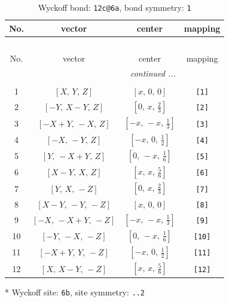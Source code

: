 \documentclass[fleqn,8pt]{jsarticle}
\begin{document}
\begin{longtable}{cccc}
\caption{Wyckoff bond: {\tt 12c@6a}, bond symmetry: {\tt 1}}
 \\
 \hline \hline
No. & vector & center & mapping \\ \hline \endfirsthead

\multicolumn{3}{l}{\tablename\ \thetable{}} \\
 \hline \hline
No. & vector & center & mapping \\ \hline \endhead

 \hline \hline
\multicolumn{3}{r}{\footnotesize\it continued ...} \\ \endfoot

 \hline \hline
\multicolumn{3}{r}{} \\ \endlastfoot

1 & $\left[ X,\, Y,\, Z \right]$ & $\left[ x,\, 0,\, 0 \right]$ & {\tt [1]} \\ \hline
2 & $\left[ - Y,\, X - Y,\, Z \right]$ & $\left[ 0,\, x,\, \frac{2}{3} \right]$ & {\tt [2]} \\ \hline
3 & $\left[ - X + Y,\, - X,\, Z \right]$ & $\left[ - x,\, - x,\, \frac{1}{3} \right]$ & {\tt [3]} \\ \hline
4 & $\left[ - X,\, - Y,\, Z \right]$ & $\left[ - x,\, 0,\, \frac{1}{2} \right]$ & {\tt [4]} \\ \hline
5 & $\left[ Y,\, - X + Y,\, Z \right]$ & $\left[ 0,\, - x,\, \frac{1}{6} \right]$ & {\tt [5]} \\ \hline
6 & $\left[ X - Y,\, X,\, Z \right]$ & $\left[ x,\, x,\, \frac{5}{6} \right]$ & {\tt [6]} \\ \hline
7 & $\left[ Y,\, X,\, - Z \right]$ & $\left[ 0,\, x,\, \frac{2}{3} \right]$ & {\tt [7]} \\ \hline
8 & $\left[ X - Y,\, - Y,\, - Z \right]$ & $\left[ x,\, 0,\, 0 \right]$ & {\tt [8]} \\ \hline
9 & $\left[ - X,\, - X + Y,\, - Z \right]$ & $\left[ - x,\, - x,\, \frac{1}{3} \right]$ & {\tt [9]} \\ \hline
10 & $\left[ - Y,\, - X,\, - Z \right]$ & $\left[ 0,\, - x,\, \frac{1}{6} \right]$ & {\tt [10]} \\ \hline
11 & $\left[ - X + Y,\, Y,\, - Z \right]$ & $\left[ - x,\, 0,\, \frac{1}{2} \right]$ & {\tt [11]} \\ \hline
12 & $\left[ X,\, X - Y,\, - Z \right]$ & $\left[ x,\, x,\, \frac{5}{6} \right]$ & {\tt [12]} \\
\end{longtable}
* Wyckoff site: {\tt 6b}, site symmetry: {\tt ..2}
\end{document}
